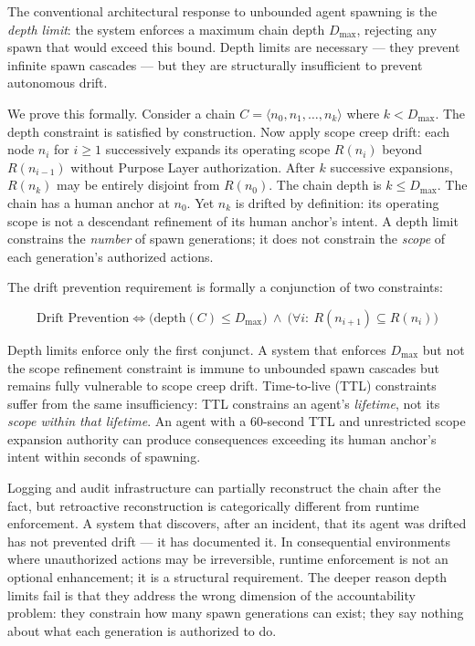The conventional architectural response to unbounded agent spawning is the \emph{depth limit}: the system enforces a maximum chain depth $D_{\max}$, rejecting any spawn that would exceed this bound. Depth limits are necessary --- they prevent infinite spawn cascades --- but they are structurally insufficient to prevent autonomous drift.

We prove this formally. Consider a chain $C = \langle n_0, n_1, \ldots, n_k \rangle$ where $k < D_{\max}$. The depth constraint is satisfied by construction. Now apply scope creep drift: each node $n_i$ for $i \geq 1$ successively expands its operating scope $R(n_i)$ beyond $R(n_{i-1})$ without Purpose Layer authorization. After $k$ successive expansions, $R(n_k)$ may be entirely disjoint from $R(n_0)$. The chain depth is $k \leq D_{\max}$. The chain has a human anchor at $n_0$. Yet $n_k$ is drifted by definition: its operating scope is not a descendant refinement of its human anchor's intent. A depth limit constrains the \emph{number} of spawn generations; it does not constrain the \emph{scope} of each generation's authorized actions.

The drift prevention requirement is formally a conjunction of two constraints:

\begin{equation}
\text{Drift Prevention} \iff \bigl(\text{depth}(C) \leq D_{\max}\bigr) \ \land \ \bigl(\forall i:\ R(n_{i+1}) \subseteq R(n_i)\bigr)
\label{eq:intro-drift-prevention}
\end{equation}

Depth limits enforce only the first conjunct. A system that enforces $D_{\max}$ but not the scope refinement constraint is immune to unbounded spawn cascades but remains fully vulnerable to scope creep drift. Time-to-live (TTL) constraints suffer from the same insufficiency: TTL constrains an agent's \emph{lifetime}, not its \emph{scope within that lifetime}. An agent with a 60-second TTL and unrestricted scope expansion authority can produce consequences exceeding its human anchor's intent within seconds of spawning.

Logging and audit infrastructure can partially reconstruct the chain after the fact, but retroactive reconstruction is categorically different from runtime enforcement. A system that discovers, after an incident, that its agent was drifted has not prevented drift --- it has documented it. In consequential environments where unauthorized actions may be irreversible, runtime enforcement is not an optional enhancement; it is a structural requirement. The deeper reason depth limits fail is that they address the wrong dimension of the accountability problem: they constrain how many spawn generations can exist; they say nothing about what each generation is authorized to do.

